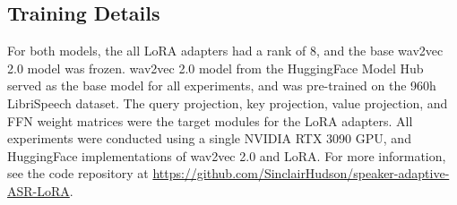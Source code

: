 \subsection{Training Details}
For both models, the all LoRA adapters had a rank of 8, and the base wav2vec 2.0 model was frozen. 
wav2vec 2.0 model from the HuggingFace Model Hub \cite{huggingface} served as the base model for all experiments, and was pre-trained on the 960h LibriSpeech dataset.
The query projection, key projection, value projection, and FFN weight matrices were the target modules for the LoRA adapters.
All experiments were conducted using a single NVIDIA RTX 3090 GPU, and HuggingFace implementations of wav2vec 2.0 and LoRA.
For more information, see the code repository at \url{https://github.com/SinclairHudson/speaker-adaptive-ASR-LoRA}.
